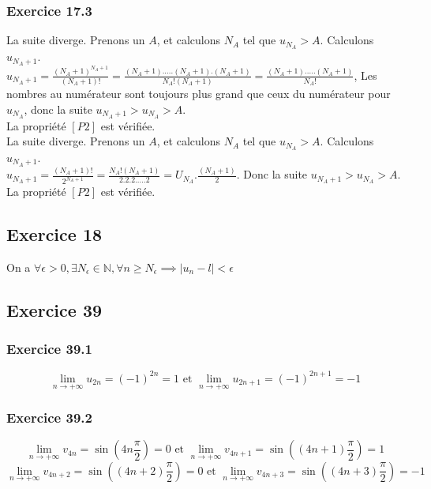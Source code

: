 \documentclass[]{book}
\theoremstyle{definition}
\newcommand{\bb}[1]{\mathbb{#1}}
\newcommand{\N}{\bb{N}}
\begin{document}
\subsubsection*{Exercice 17.3}
La suite diverge. Prenons un $A$, et calculons $N_A$ tel que $u_{N_A} > A$. Calculons $u_{N_A+1}$. \\
$u_{N_A+1} = \frac{(N_A+1)^{N_A+1}}{(N_A+1)!} = \frac{(N_A+1).\ldots.(N_A+1).(N_A+1)}{N_A!(N_A+1)} = \frac{(N_A+1).\ldots.(N_A+1)}{N_A!}$, Les nombres au num\'erateur sont toujours plus grand que ceux du num\'erateur pour $u_{N_A}$, donc la suite $u_{N_A+1} > u_{N_A} > A$.\\
La propri\'et\'e $[P2]$ est v\'erifi\'ee.\\

La suite diverge. Prenons un $A$, et calculons $N_A$ tel que $u_{N_A} > A$. Calculons $u_{N_A+1}$. \\
$u_{N_A+1} = \frac{(N_A+1)!}{2^{N_A+1}} = \frac{N_A!(N_A+1)}{2.2.2.\ldots.2} = U_{N_A}.\frac{(N_A+1)}{2}$. Donc la suite $u_{N_A+1} > u_{N_A} > A$.\\
La propri\'et\'e $[P2]$ est v\'erifi\'ee.\\

\subsection*{Exercice 18}
On a $\forall \epsilon > 0, \exists N_{\epsilon} \in \N, \forall n \geq N_{\epsilon}  \implies  |u_n -l| < \epsilon$


\subsection*{Exercice 39}
\subsubsection*{Exercice 39.1}
$$\lim_{n \to +\infty}{u_{2n}} = (-1)^{2n} = 1 \textrm{  et    } \lim_{n \to +\infty}{u_{2n+1}} = (-1)^{2n+1} = -1$$

\subsubsection*{Exercice 39.2}
$$\lim_{n \to +\infty}{v_{4n}} = \sin(4n\frac{\pi}{2}) = 0 \textrm{  et    } \lim_{n \to +\infty}{v_{4n+1}} = \sin((4n+1)\frac{\pi}{2}) = 1$$
$$\lim_{n \to +\infty}{v_{4n+2}} = \sin((4n+2)\frac{\pi}{2}) = 0 \textrm{  et    } \lim_{n \to +\infty}{v_{4n+3}} = \sin((4n+3)\frac{\pi}{2}) = -1$$
\end{document}
